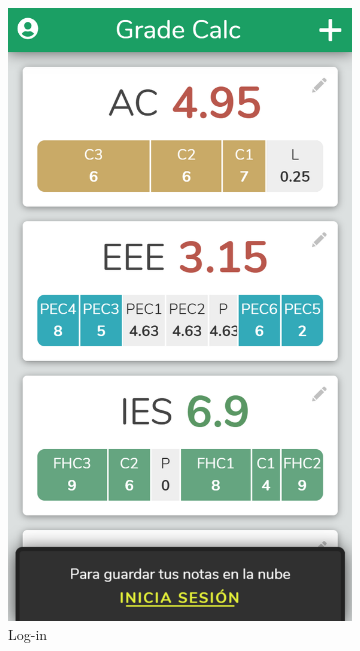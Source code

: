 \vfill
\begin{figure}[ht!]
    \begin{subfigure}[b]{0.25\textwidth-0.1cm}
        \centering
        \includegraphics[width=\textwidth]{media/screenshots/screenshot-notification-login.png}
        \caption{Log-in}
    \end{subfigure}
    \hfill
    \begin{subfigure}[b]{0.25\textwidth-0.1cm}
        \centering

\end{subfigure}
\end{figure}
